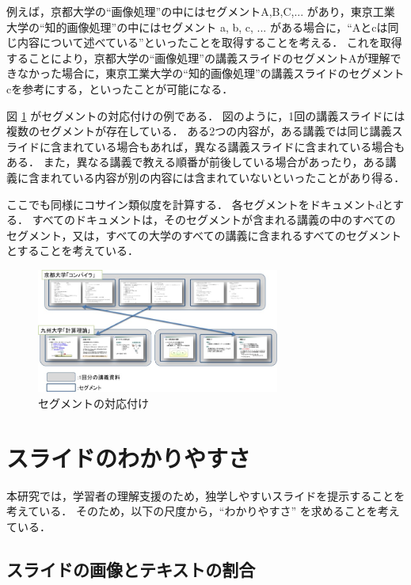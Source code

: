 \documentclass{js}
\begin{document}
例えば，京都大学の``画像処理''の中にはセグメントA,B,C,... があり，東京工業大学の``知的画像処理''の中にはセグメント a, b, c, ... がある場合に，``Aとcは同じ内容について述べている''といったことを取得することを考える．
これを取得することにより，京都大学の``画像処理''の講義スライドのセグメントAが理解できなかった場合に，東京工業大学の``知的画像処理''の講義スライドのセグメントcを参考にする，といったことが可能になる．

図 \ref{fig:segsim} がセグメントの対応付けの例である．
図のように，1回の講義スライドには複数のセグメントが存在している．
ある2つの内容が，ある講義では同じ講義スライドに含まれている場合もあれば，異なる講義スライドに含まれている場合もある．
また，異なる講義で教える順番が前後している場合があったり，ある講義に含まれている内容が別の内容には含まれていないといったことがあり得る．

ここでも同様にコサイン類似度を計算する．
各セグメントをドキュメントdとする．
すべてのドキュメントは，そのセグメントが含まれる講義の中のすべてのセグメント，又は，すべての大学のすべての講義に含まれるすべてのセグメントとすることを考えている．

\begin{figure}[tb]
 \begin{center}
  \includegraphics[width=8cm,bb=0 0 779 398]{segsim.jpg}
 \end{center}
 \caption{セグメントの対応付け}
 \label{fig:segsim}
\end{figure}






\section{スライドのわかりやすさ}

本研究では，学習者の理解支援のため，独学しやすいスライドを提示することを考えている．
そのため，以下の尺度から，``わかりやすさ'' を求めることを考えている．

\subsection{スライドの画像とテキストの割合}
\end{document}
